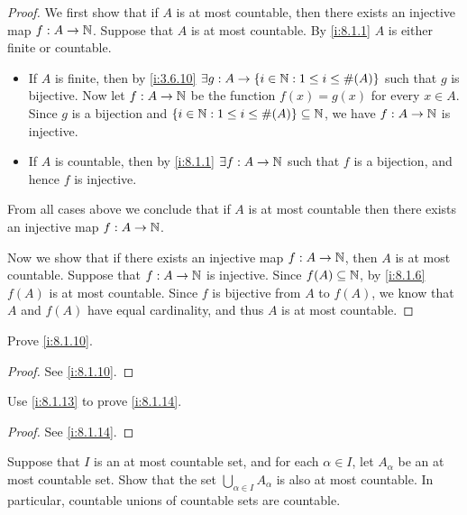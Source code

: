 \begin{proof}
  We first show that if \(A\) is at most countable, then there exists an injective map \(f : A \to \mathbb{N}\).
  Suppose that \(A\) is at most countable.
  By \cref{i:8.1.1} \(A\) is either finite or countable.
  \begin{itemize}
    \item If \(A\) is finite, then by \cref{i:3.6.10} \(\exists g : A \to \left\lbrace i \in \mathbb{N} : 1 \leq i \leq \#(A)\right\rbrace\) such that \(g\) is bijective.
          Now let \(f : A \to \mathbb{N}\) be the function \(f(x) = g(x)\) for every \(x \in A\).
          Since \(g\) is a bijection and \(\left\lbrace i \in \mathbb{N} : 1 \leq i \leq \#(A)\right\rbrace \subseteq \mathbb{N}\), we have \(f : A \to \mathbb{N}\) is injective.
    \item If \(A\) is countable, then by \cref{i:8.1.1} \(\exists f : A \to \mathbb{N}\) such that \(f\) is a bijection, and hence \(f\) is injective.
  \end{itemize}
  From all cases above we conclude that if \(A\) is at most countable then there exists an injective map \(f : A \to \mathbb{N}\).

  Now we show that if there exists an injective map \(f : A \to \mathbb{N}\), then \(A\) is at most countable.
  Suppose that \(f : A \to \mathbb{N}\) is injective.
  Since \(f(A) \subseteq \mathbb{N}\), by \cref{i:8.1.6} \(f(A)\) is at most countable.
  Since \(f\) is bijective from \(A\) to \(f(A)\), we know that \(A\) and \(f(A)\) have equal cardinality, and thus \(A\) is at most countable.
\end{proof}

\begin{ex}\label{i:ex:8.1.7}
  Prove \cref{i:8.1.10}.
\end{ex}

\begin{proof}
  See \cref{i:8.1.10}.
\end{proof}

\begin{ex}\label{i:ex:8.1.8}
  Use \cref{i:8.1.13} to prove \cref{i:8.1.14}.
\end{ex}

\begin{proof}
  See \cref{i:8.1.14}.
\end{proof}

\begin{ex}\label{i:ex:8.1.9}
  Suppose that \(I\) is an at most countable set, and for each \(\alpha \in I\), let \(A_{\alpha}\) be an at most countable set.
  Show that the set \(\bigcup_{\alpha \in I} A_{\alpha}\) is also at most countable.
  In particular, countable unions of countable sets are countable.
\end{ex}

